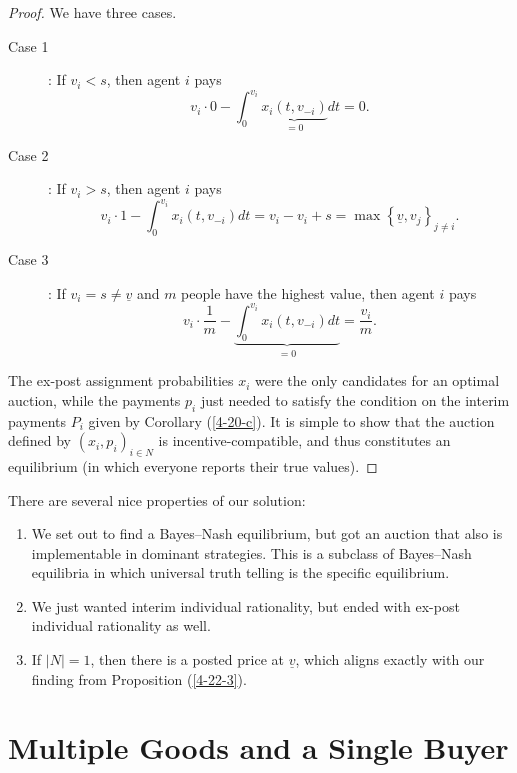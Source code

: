 \begin{proof}
	We have three cases.
	\begin{description}
		\item[Case 1]: If $v_i < s$, then agent $i$ pays \[
			v_i \cdot 0 - \int_{0}^{v_i} \underbrace{x_i(t,v_{-i})}_{=0}dt = 0
		.\]
		\item[Case 2]: If $v_i > s $, then agent $i$ pays \[
			v_i \cdot 1 - \int_{0}^{v_i} x_i(t,v_{-i})dt = v_i - v_i + s = \max \left\{\underline{v}, v_j\right\}_{j\ne i}
		.\]
		\item[Case 3]: If $v_i = s \ne \underline{v}$ and $m$ people have the highest value, then agent $i$ pays \[
			v_i \cdot \frac{1}{m} - \underbrace{\int_{0}^{v_i} x_i(t,v_{-i}) dt}_{=0} = \frac{v_i}{m}
		.\]
	\end{description}
	
	The ex-post assignment probabilities $x_i$ were the only candidates for an optimal auction, while the payments $p_i$ just needed to satisfy the condition on the interim payments $P_i$ given by Corollary (\ref{4-20-c}).
	It is simple to show that the auction defined by $(x_i,p_i)_{i \in N}$ is incentive-compatible, and thus constitutes an equilibrium (in which everyone reports their true values).
\end{proof}

\begin{remark}
	There are several nice properties of our solution:
	\begin{enumerate}[label = (\roman*)]
		\item We set out to find a Bayes--Nash equilibrium, but got an auction that also is implementable in dominant strategies. This is a subclass of Bayes--Nash equilibria in which universal truth telling is the specific equilibrium.
		\item We just wanted interim individual rationality, but ended with ex-post individual rationality as well.
		\item If $\left| N \right| = 1$, then there is a posted price at $\underline{v}$, which aligns exactly with our finding from Proposition (\ref{4-22-3}).
	\end{enumerate}
\end{remark}

\section{Multiple Goods and a Single Buyer}

